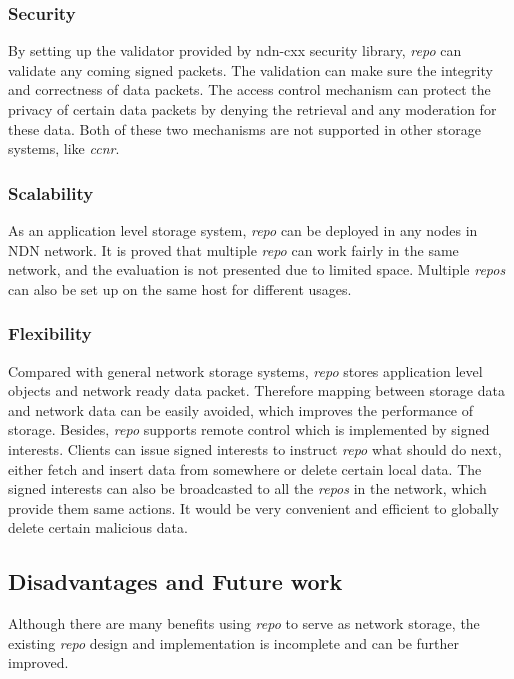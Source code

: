 \documentclass[conference]{IEEEtran}
\begin{document}
\subsubsection{Security}

By setting up the validator provided by ndn-cxx security library, \emph{repo} can validate any coming signed packets. The validation can make sure the integrity and correctness of data packets. The access control mechanism can protect the privacy of certain data packets by denying the retrieval and any moderation for these data. Both of these two mechanisms are not supported in other storage systems, like \emph{ccnr}.

\subsubsection{Scalability}

As an application level storage system, \emph{repo} can be deployed in any nodes in NDN network. It is proved that multiple \emph{repo} can work fairly in the same network, and the evaluation is not presented due to limited space. Multiple \emph{repos} can also be set up on the same host for different usages.

\subsubsection{Flexibility}

Compared with general network storage systems, \emph{repo} stores application level objects and network ready data packet. Therefore mapping between storage data and network data can be easily avoided, which improves the performance of storage. Besides, \emph{repo} supports remote control which is implemented by signed interests. Clients can issue signed interests to instruct \emph{repo} what should do next, either fetch and insert data from somewhere or delete certain local data. The signed interests can also be broadcasted to all the \emph{repos} in the network, which provide them same actions. It would be very convenient and efficient to globally delete certain malicious data.

\subsection{Disadvantages and Future work}

Although there are many benefits using \emph{repo} to serve as network storage, the existing \emph{repo} design and implementation is incomplete and can be further improved.
\end{document}
